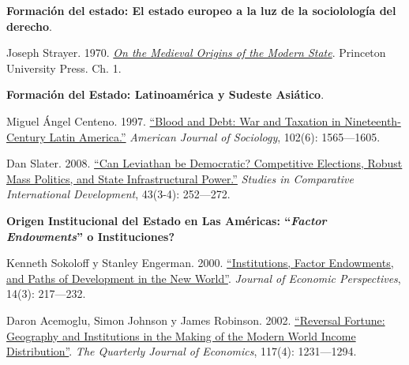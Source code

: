 \documentclass[letterpaper]{article}
\renewenvironment{itemize}{
  \begin{list}{}{
    \setlength{\leftmargin}{1.5em}
  }
}{
  \end{list}
}
\begin{document}
\begin{enumerate}[label=\roman*.]
\begin{itemize}
			\item[3.] {\bf Formaci\'on del estado: El estado europeo a la luz de la sociololog\'ia del derecho}.
				\begin{itemize} 
					\item[$\circ$] Joseph Strayer. 1970. \href{https://github.com/hbahamonde/Ciencia_Politica_II/raw/master/Readings/Strayer.pdf}{\emph{On the Medieval Origins of the Modern State}}. Princeton University Press. Ch. 1.
				\end{itemize}

			\item[4.] {\bf Formaci\'on del Estado: Latinoam\'erica y Sudeste Asi\'atico}.
				\begin{itemize}
					\item[$\circ$] Miguel \'Angel Centeno. 1997. \href{https://github.com/hbahamonde/Ciencia_Politica_II/raw/master/Readings/Centeno.pdf}{``Blood and Debt: War and Taxation in Nineteenth-Century Latin America.''} \emph{American Journal of Sociology}, 102(6): 1565---1605. 
					
					\item[$\circ$] Dan Slater. 2008. \href{https://github.com/hbahamonde/Ciencia_Politica_II/raw/master/Readings/Slater.pdf}{``Can Leviathan be Democratic? Competitive Elections, Robust Mass Politics, and State Infrastructural Power.''} \emph{Studies in Comparative International Development}, 43(3-4): 252---272.
				\end{itemize}

		\item[5.] {\bf Origen Institucional del Estado en Las Am\'ericas: ``\emph{Factor Endowments}'' o Instituciones?}
				\begin{itemize}
					\item[$\circ$] Kenneth Sokoloff y Stanley Engerman. 2000. \href{https://github.com/hbahamonde/Ciencia_Politica_II/raw/master/Readings/Sokoloff_Engerman.pdf}{``Institutions, Factor Endowments, and Paths of Development in the New World''}. \emph{Journal of Economic Perspectives}, 14(3): 217---232. 
					\item[$\circ$] Daron Acemoglu, Simon Johnson y James Robinson. 2002. \href{https://github.com/hbahamonde/Ciencia_Politica_II/raw/master/Readings/Reversal_of_fortune.pdf}{``Reversal Fortune: Geography and Institutions in the Making of the Modern World Income Distribution''}. \emph{The Quarterly Journal of Economics}, 117(4): 1231---1294. 
				\end{itemize}



\end{itemize}
\end{enumerate}
\end{document}
